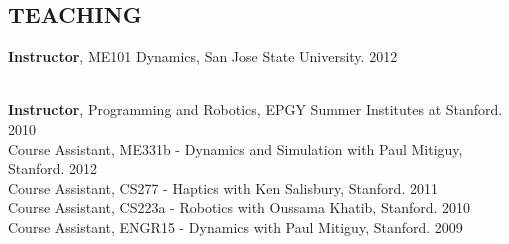 \documentclass[line,margin]{res}
\newcommand{\CVOnly}[1]{}
\newcommand{\CVOnly}[1]{#1}
\begin{document}
\begin{resume}
\section{TEACHING} 
\vspace{1.0pc}
{\bf Instructor}, ME101 Dynamics, San Jose State University\CVOnly{, 49 students}. \hfill {} \CVOnly{Fall }2012%
\CVOnly{\\[0.0pc]Student feedback in ??? percentile for SOMETHING, ??? percentile overall.}
\CVOnly{\\[0.0pc]{\bf Instructor}, ME101 Dynamics, San Jose State University, 56 students. \hfill Fall 2011}
\CVOnly{\\[0.0pc]Student feedback in ??? percentile for SOMETHING, ??? percentile overall.}
\\[0.0pc]{\bf Instructor}, Programming and Robotics, EPGY Summer Institutes at Stanford. \hfill \CVOnly{Summer} 
2010
\\[0.4pc] Course Assistant, ME331b - Dynamics and Simulation with Paul Mitiguy, Stanford. \hfill \CVOnly{Spring} 2012
\\[0.0pc] Course Assistant, CS277 - Haptics with Ken Salisbury, Stanford. \hfill \CVOnly{Winter}
2011
\\[0.0pc] Course Assistant, CS223a - Robotics with Oussama Khatib, Stanford. \hfill \CVOnly{Winter} 
2010 
\\[0.0pc] Course Assistant, ENGR15 - Dynamics with Paul Mitiguy, Stanford. \hfill \CVOnly{Fall}
2009 
%
%

\end{resume}
\end{document}
